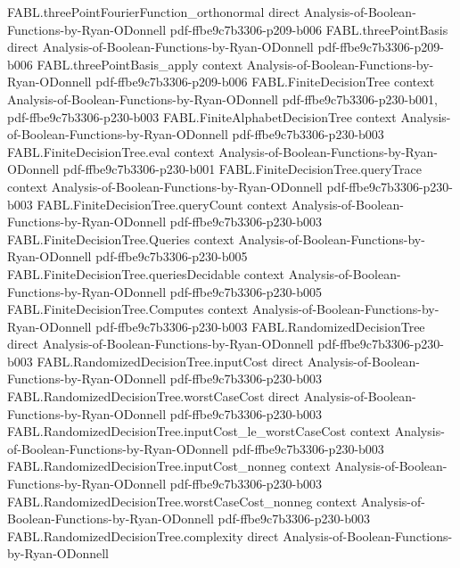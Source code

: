 \begin{theorem}
\proofstep
  {FABL.threePointFourierFunction_orthonormal}
  {direct}
  {Analysis-of-Boolean-Functions-by-Ryan-ODonnell}
  {pdf-ffbe9c7b3306-p209-b006}
\proofstep
  {FABL.threePointBasis}
  {direct}
  {Analysis-of-Boolean-Functions-by-Ryan-ODonnell}
  {pdf-ffbe9c7b3306-p209-b006}
\proofstep
  {FABL.threePointBasis_apply}
  {context}
  {Analysis-of-Boolean-Functions-by-Ryan-ODonnell}
  {pdf-ffbe9c7b3306-p209-b006}
\proofstep
  {FABL.FiniteDecisionTree}
  {context}
  {Analysis-of-Boolean-Functions-by-Ryan-ODonnell}
  {pdf-ffbe9c7b3306-p230-b001,
    pdf-ffbe9c7b3306-p230-b003}
\proofstep
  {FABL.FiniteAlphabetDecisionTree}
  {context}
  {Analysis-of-Boolean-Functions-by-Ryan-ODonnell}
  {pdf-ffbe9c7b3306-p230-b003}
\proofstep
  {FABL.FiniteDecisionTree.eval}
  {context}
  {Analysis-of-Boolean-Functions-by-Ryan-ODonnell}
  {pdf-ffbe9c7b3306-p230-b001}
\proofstep
  {FABL.FiniteDecisionTree.queryTrace}
  {context}
  {Analysis-of-Boolean-Functions-by-Ryan-ODonnell}
  {pdf-ffbe9c7b3306-p230-b003}
\proofstep
  {FABL.FiniteDecisionTree.queryCount}
  {context}
  {Analysis-of-Boolean-Functions-by-Ryan-ODonnell}
  {pdf-ffbe9c7b3306-p230-b003}
\proofstep
  {FABL.FiniteDecisionTree.Queries}
  {context}
  {Analysis-of-Boolean-Functions-by-Ryan-ODonnell}
  {pdf-ffbe9c7b3306-p230-b005}
\proofstep
  {FABL.FiniteDecisionTree.queriesDecidable}
  {context}
  {Analysis-of-Boolean-Functions-by-Ryan-ODonnell}
  {pdf-ffbe9c7b3306-p230-b005}
\proofstep
  {FABL.FiniteDecisionTree.Computes}
  {context}
  {Analysis-of-Boolean-Functions-by-Ryan-ODonnell}
  {pdf-ffbe9c7b3306-p230-b003}
\proofstep
  {FABL.RandomizedDecisionTree}
  {direct}
  {Analysis-of-Boolean-Functions-by-Ryan-ODonnell}
  {pdf-ffbe9c7b3306-p230-b003}
\proofstep
  {FABL.RandomizedDecisionTree.inputCost}
  {direct}
  {Analysis-of-Boolean-Functions-by-Ryan-ODonnell}
  {pdf-ffbe9c7b3306-p230-b003}
\proofstep
  {FABL.RandomizedDecisionTree.worstCaseCost}
  {direct}
  {Analysis-of-Boolean-Functions-by-Ryan-ODonnell}
  {pdf-ffbe9c7b3306-p230-b003}
\proofstep
  {FABL.RandomizedDecisionTree.inputCost_le_worstCaseCost}
  {context}
  {Analysis-of-Boolean-Functions-by-Ryan-ODonnell}
  {pdf-ffbe9c7b3306-p230-b003}
\proofstep
  {FABL.RandomizedDecisionTree.inputCost_nonneg}
  {context}
  {Analysis-of-Boolean-Functions-by-Ryan-ODonnell}
  {pdf-ffbe9c7b3306-p230-b003}
\proofstep
  {FABL.RandomizedDecisionTree.worstCaseCost_nonneg}
  {context}
  {Analysis-of-Boolean-Functions-by-Ryan-ODonnell}
  {pdf-ffbe9c7b3306-p230-b003}
\proofstep
  {FABL.RandomizedDecisionTree.complexity}
  {direct}
  {Analysis-of-Boolean-Functions-by-Ryan-ODonnell}

\end{theorem}
